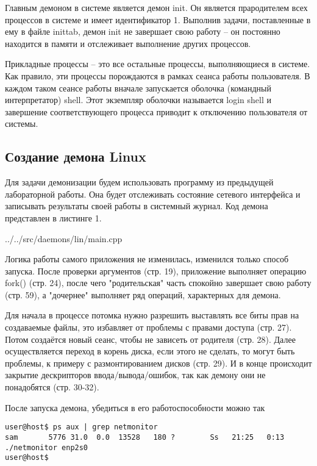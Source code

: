 Главным демоном в системе является демон init\cite{Cit2}. Он является прародителем всех процессов в системе и имеет идентификатор 1. Выполнив задачи, поставленные в ему в файле inittab, демон init не завершает свою работу -- он постоянно находится в памяти и отслеживает выполнение других процессов.

Прикладные процессы -- это все остальные процессы, выполняющиеся в системе. Как правило, эти процессы порождаются в рамках сеанса работы пользователя. В каждом таком сеансе работы вначале запускается оболочка (командный интерпретатор) shell. Этот экземпляр оболочки называется login shell и завершение соответствующего процесса приводит к отключению пользователя от системы.

\subsection{Создание демона Linux}

Для задачи демонизации будем использовать программу из предыдущей лабораторной работы. Она будет отслеживать состояние сетевого интерфейса и записывать результаты своей работы в системный журнал. Код демона представлен в листинге 1.


{../../src/daemons/lin/main.cpp}

Логика работы самого приложения не изменилась, изменился только способ запуска. После проверки аргументов (стр. 19), приложение выполняет операцию fork() (стр. 24), после чего "родительская" часть спокойно завершает свою работу (стр. 59), а "дочернее" выполняет ряд операций, характерных для демона.

Для начала в процессе потомка нужно разрешить выставлять все биты прав на создаваемые файлы, это избавляет от проблемы с правами доступа (стр. 27). Потом создаётся новый сеанс, чтобы не зависеть от родителя (стр. 28). Далее осуществляется переход в корень диска, если этого не сделать, то могут быть проблемы, к примеру с размонтированием дисков (стр. 29). И в конце происходит закрытие дескрипторов ввода/вывода/ошибок, так как демону они не понадобятся (стр. 30-32).

После запуска демона, убедиться в его работоспособности можно так

\begin{Verbatim}[frame=single]
user@host$ ps aux | grep netmonitor 
sam       5776 31.0  0.0  13528   180 ?        Ss   21:25   0:13 ./netmonitor enp2s0
user@host$
\end{Verbatim}

